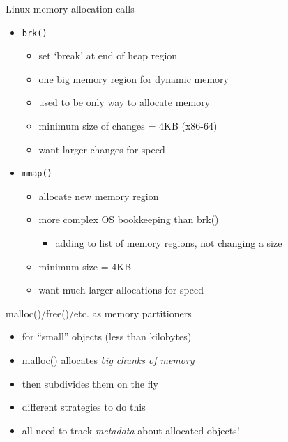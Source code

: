 


\begin{frame}{Linux memory allocation calls}
    \begin{itemize}
    \item \texttt{brk()}
        \begin{itemize}
        \item set `break' at end of heap region
        \item one big memory region for dynamic memory
        \item used to be only way to allocate memory
        \item minimum size of changes = 4KB (x86-64)
        \item want larger changes for speed
        \end{itemize}
    \item \texttt{mmap()}
        \begin{itemize}
        \item allocate new memory region
        \item more complex OS bookkeeping than brk()
            \begin{itemize}
            \item adding to list of memory regions, not changing a size
            \end{itemize}
        \item minimum size = 4KB
        \item want much larger allocations for speed
        \end{itemize}
    \end{itemize}
\end{frame}

\begin{frame}{malloc()/free()/etc. as memory partitioners}
    \begin{itemize}
    \item for ``small'' objects (less than kilobytes)
    \item malloc() allocates \textit{big chunks of memory}
    \item then subdivides them on the fly
    \vspace{.5cm}
    \item different strategies to do this
    \item all need to track \textit{metadata} about allocated objects!
    \end{itemize}
\end{frame}

